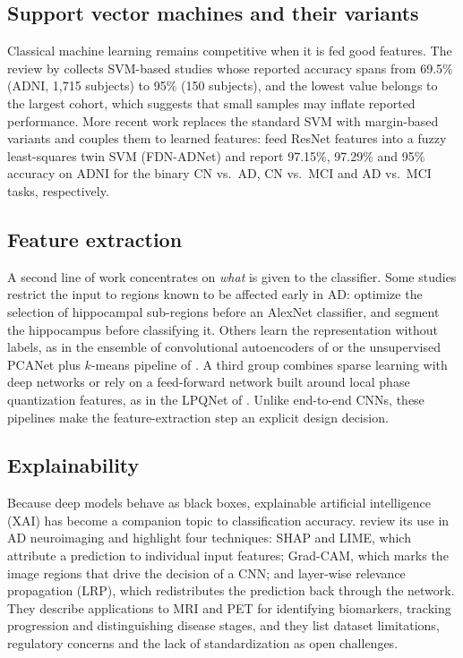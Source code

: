 \subsection{Support vector machines and their variants}
\label{sec:rw_svm}

Classical machine learning remains competitive when it is fed good features.
The review by \textcite{nibila2026artificial} collects SVM-based studies whose
reported accuracy spans from 69.5\% (ADNI, 1,715 subjects) to 95\% (150
subjects), and the lowest value belongs to the largest cohort, which suggests that
small samples may inflate reported performance. More recent work replaces
the standard SVM with margin-based variants and couples them to learned features:
\textcite{sharma2022fdnadnet} feed ResNet features into a fuzzy least-squares twin SVM
(FDN-ADNet) and report 97.15\%, 97.29\% and 95\% accuracy on ADNI for the
binary CN vs.\ AD, CN vs.\ MCI and AD vs.\ MCI tasks, respectively.

\subsection{Feature extraction}
\label{sec:rw_features}

A second line of work concentrates on \emph{what} is given to the classifier.
Some studies restrict the input to regions known to be affected early in AD:
\textcite{chitradevi2020analysis} optimize the selection of hippocampal
sub-regions before an AlexNet classifier, and \textcite{liu2020multimodel}
segment the hippocampus before classifying it. Others learn the representation
without labels, as in the ensemble of convolutional autoencoders of
\textcite{hedayati2021deep} or the unsupervised PCANet plus $k$-means pipeline of
\textcite{bi2020computer}. A third group combines sparse learning with deep
networks \parencite{chen2021iterative} or rely on a feed-forward network built around local phase quantization
features, as in the LPQNet of \textcite{kaplan2021feedforward}. Unlike end-to-end CNNs,
these pipelines make the feature-extraction step an explicit design decision.

\subsection{Explainability}
\label{sec:rw_xai}

Because deep models behave as black boxes, explainable artificial intelligence
(XAI) has become a companion topic to classification accuracy.
\textcite{taiyebkhosroshahi2025explainable} review its use in AD neuroimaging and
highlight four techniques: SHAP and LIME, which attribute a prediction to
individual input features; Grad-CAM, which marks the image regions that drive the
decision of a CNN; and layer-wise relevance propagation (LRP), which redistributes
the prediction back through the network. They describe applications to MRI and PET
for identifying biomarkers, tracking progression and distinguishing disease
stages, and they list dataset limitations, regulatory concerns and the lack of
standardization as open challenges.

